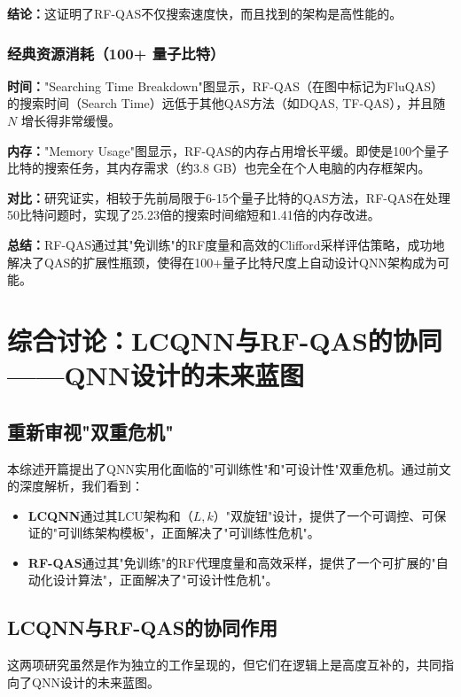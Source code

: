 \documentclass[12pt,a4paper]{article}
\begin{document}
\textbf{结论：}这证明了RF-QAS不仅搜索速度快，而且找到的架构是高性能的。

\subsubsection{经典资源消耗（100+ 量子比特）}

\textbf{时间：}"Searching Time Breakdown"图显示，RF-QAS（在图中标记为FluQAS）的搜索时间（Search Time）远低于其他QAS方法（如DQAS, TF-QAS），并且随 $N$ 增长得非常缓慢。

\textbf{内存：}"Memory Usage"图显示，RF-QAS的内存占用增长平缓。即使是100个量子比特的搜索任务，其内存需求（约3.8 GB）也完全在个人电脑的内存框架内。

\textbf{对比：}研究证实，相较于先前局限于6-15个量子比特的QAS方法，RF-QAS在处理50比特问题时，实现了25.23倍的搜索时间缩短和1.41倍的内存改进。

\textbf{总结：}RF-QAS通过其"免训练"的RF度量和高效的Clifford采样评估策略，成功地解决了QAS的扩展性瓶颈，使得在100+量子比特尺度上自动设计QNN架构成为可能。

\section{综合讨论：LCQNN与RF-QAS的协同——QNN设计的未来蓝图}

\subsection{重新审视"双重危机"}

本综述开篇提出了QNN实用化面临的"可训练性"和"可设计性"双重危机。通过前文的深度解析，我们看到：

\begin{itemize}
\item \textbf{LCQNN}通过其LCU架构和（$L, k$）"双旋钮"设计，提供了一个可调控、可保证的"可训练架构模板"，正面解决了"可训练性危机"。
\item \textbf{RF-QAS}通过其"免训练"的RF代理度量和高效采样，提供了一个可扩展的"自动化设计算法"，正面解决了"可设计性危机"。
\end{itemize}

\subsection{LCQNN与RF-QAS的协同作用}

这两项研究虽然是作为独立的工作呈现的，但它们在逻辑上是高度互补的，共同指向了QNN设计的未来蓝图。
\end{document}
